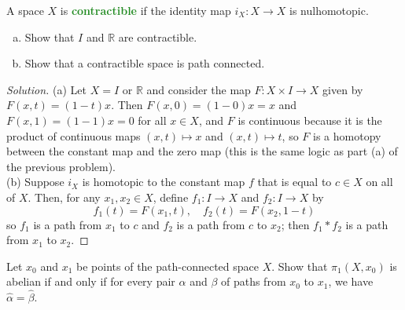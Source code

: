 \documentclass[10pt]{article}
\providecommand{\RR}{\mathbb R}
\providecommand{\ii}{\item}
\newenvironment{soln}{\begin{proof}[Solution]}{\end{proof}}
\providecommand{\vocab}[1]{{\textbf{\textcolor{ForestGreen}{#1}}}}
\begin{document}
\begin{problem}
    [Munkres 51.3]
    A space $X$ is \vocab{contractible} if the
    identity map $i_X\colon X\to X$ is nulhomotopic.
    \begin{enumerate}[(a)]
        \ii Show that $I$ and $\RR$ are contractible.
	\ii Show that a contractible space is path connected.
    \end{enumerate}
\end{problem}

\begin{soln}
    (a) Let $X = I$ or $\RR$ and consider the map
    $F\colon X\times I\to X$ given by $F(x,t) = (1-t)x$.
    Then $F(x,0) = (1-0)x = x$ and $F(x,1) = (1-1)x = 0$ for all $x\in X$,
    and $F$ is continuous because it is the product of continuous maps
    $(x,t)\mapsto x$ and $(x,t)\mapsto t$,
    so $F$ is a homotopy between the constant map and the zero map
    (this is the same logic as part (a) of the previous problem).
    \\

    (b) Suppose $i_X$ is homotopic to the constant map $f$
    that is equal to $c\in X$ on all of $X$.
    Then, for any $x_1,x_2\in X$, define
    $f_1\colon I\to X$ and $f_2\colon I\to X$ by
    \begin{equation*}
        f_1(t) = F(x_1,t),\quad f_2(t) = F(x_2,1-t)
    \end{equation*}
    so $f_1$ is a path from $x_1$ to $c$
    and $f_2$ is a path from $c$ to $x_2$;
    then $f_1\ast f_2$ is a path from $x_1$ to $x_2$.
\end{soln}

\begin{problem}
    [Munkres 52.3]
    Let $x_0$ and $x_1$ be points of the path-connected space $X$.
    Show that $\pi_1(X,x_0)$ is abelian if and only if
    for every pair $\alpha$ and $\beta$ of paths
    from $x_0$ to $x_1$, we have $\widehat\alpha = \widehat\beta$.
\end{problem}
\end{document}
